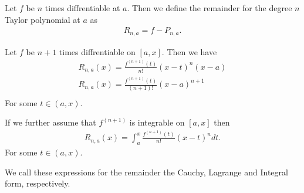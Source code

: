\documentclass[]{article}
\begin{document}
\begin{defi} [Remainder]
	Let $f$ be $n$ times diffrentiable at $a$. Then we define the remainder for the degree $n$ Taylor polynomial at $a$ as
	\begin{align*}
			R_{n,a} = f - P_{n,a}.
	\end{align*}
\end{defi}

\begin{thm}
		Let $f$ be $n+1$ times diffrentiable on $[a,x]$. Then we have
		\begin{align*}
				R_{n,a}(x) = \frac{f^{(n+1)}(t)}{n!}(x-t)^n(x-a) \\
				R_{n,a}(x) = \frac{f^{(n+1)}(t)}{(n+1)!}(x-a)^{n+1} \\
		\end{align*}
		For some $t \in (a,x)$. 

		If we further assume that $f^{(n+1)}$ is integrable on $[a,x]$ then
		\begin{align*}
				R_{n,a}(x) = \int_a^x \frac{f^{(n+1)}(t)}{n!}(x-t)^n dt.
		\end{align*}
		For some $t \in (a,x)$. 

		We call these expressions for the remainder the Cauchy, Lagrange and Integral form, respectively.
\end{thm}
\end{document}
